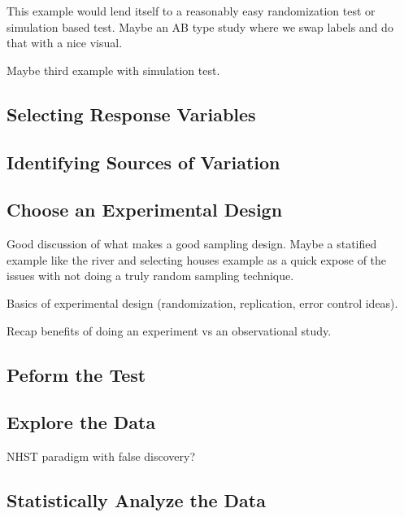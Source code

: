 \documentclass[]{book}
\begin{document}
This example would lend itself to a reasonably easy randomization test or simulation based test. Maybe an AB type study where we swap labels and do that with a nice visual.

Maybe third example with simulation test.

\hypertarget{selecting-response-variables-1}{%
\subsection{Selecting Response Variables}\label{selecting-response-variables-1}}

\hypertarget{identifying-sources-of-variation-1}{%
\subsection{Identifying Sources of Variation}\label{identifying-sources-of-variation-1}}

\hypertarget{choose-an-experimental-design-1}{%
\subsection{Choose an Experimental Design}\label{choose-an-experimental-design-1}}

Good discussion of what makes a good sampling design. Maybe a statified example like the river and selecting houses example as a quick expose of the issues with not doing a truly random sampling technique.

Basics of experimental design (randomization, replication, error control ideas).

Recap benefits of doing an experiment vs an observational study.

\hypertarget{peform-the-test-1}{%
\subsection{Peform the Test}\label{peform-the-test-1}}

\hypertarget{explore-the-data}{%
\subsection{Explore the Data}\label{explore-the-data}}

NHST paradigm with false discovery?

\hypertarget{statistically-analyze-the-data-1}{%
\subsection{Statistically Analyze the Data}\label{statistically-analyze-the-data-1}}
\end{document}
